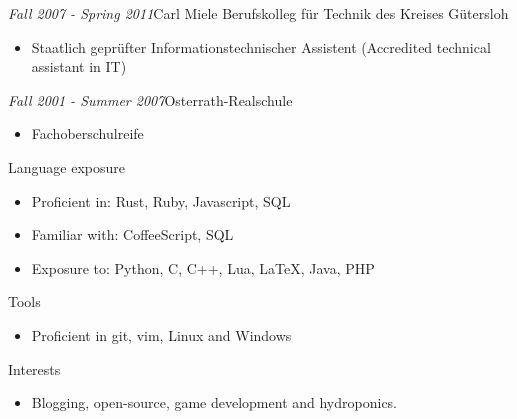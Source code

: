 \documentclass[12pt]{article}
\begin{document}
\emph{Fall 2007 - Spring 2011}\hfill Carl Miele Berufskolleg für Technik des Kreises Gütersloh
\begin{itemize}
  \setlength{\itemsep}{0cm}
  \setlength{\parskip}{0.1cm}
  \item[] Staatlich geprüfter Informationstechnischer Assistent (Accredited technical assistant in IT)
\end{itemize}

\emph{Fall 2001 - Summer 2007}\hfill Osterrath-Realschule
\begin{itemize}
  \setlength{\itemsep}{0cm}
  \setlength{\parskip}{0.1cm}
  \item[] Fachoberschulreife
\end{itemize}

\vspace{0.5cm}
{\Large Language exposure}
\begin{itemize}
  \setlength{\itemsep}{0cm}
  \setlength{\parskip}{0cm}
  \item[] Proficient in: Rust, Ruby, Javascript, SQL
  \item[] Familiar with: CoffeeScript, SQL
  \item[] Exposure to: Python, C, C++, Lua, LaTeX, Java, PHP
\end{itemize}

\vspace{0.5cm}
{\Large Tools}
\begin{itemize}
  \setlength{\itemsep}{0cm}
  \setlength{\parskip}{0cm}
  \item[] Proficient in git, vim, Linux and Windows
\end{itemize}

\vspace{0.5cm}
{\Large Interests}
\begin{itemize}
  \setlength{\itemsep}{0cm}
  \setlength{\parskip}{0cm}
  \item[] Blogging, open-source, game development and hydroponics.
\end{itemize}
\end{document}
